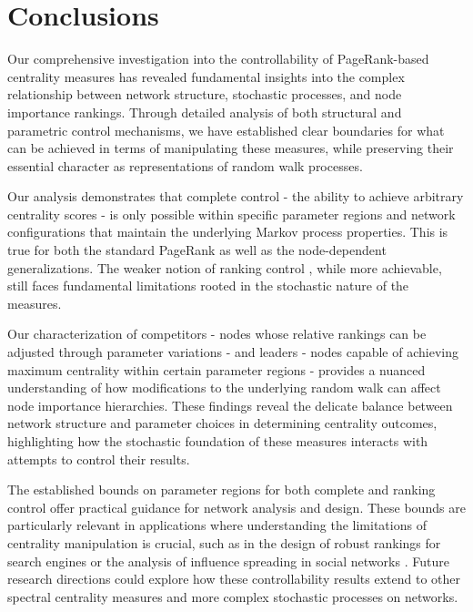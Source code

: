 \documentclass[sn-mathphys-ay]{sn-jnl}%
\theoremstyle{thmstyleone}%
\theoremstyle{thmstyletwo}%
\theoremstyle{thmstylethree}%
\begin{document}
\section{Conclusions}\label{sec:conclusions}


Our comprehensive investigation into the controllability of PageRank-based centrality measures has revealed fundamental insights into the complex relationship between network structure, stochastic processes, and node importance rankings. Through detailed analysis of both structural and parametric control mechanisms, we have established clear boundaries for what can be achieved in terms of manipulating these measures, while preserving their essential character as representations of random walk processes.


Our analysis demonstrates that complete control - the ability to achieve arbitrary centrality scores - is only possible within specific parameter regions and network configurations that maintain the underlying Markov process properties. This is true for both the standard PageRank as well as the node-dependent generalizations. The weaker notion of ranking control \cite{arrigo2020beyond, contrerasaso2023pagerank}, while more achievable, still faces fundamental limitations rooted in the stochastic nature of the measures.

Our characterization of competitors - nodes whose relative rankings can be adjusted through parameter variations - and leaders - nodes capable of achieving maximum centrality within certain parameter regions - provides a nuanced understanding of how modifications to the underlying random walk can affect node importance hierarchies. These findings reveal the delicate balance between network structure and parameter choices in determining centrality outcomes, highlighting how the stochastic foundation of these measures interacts with attempts to control their results.

The established bounds on parameter regions for both complete and ranking control offer practical guidance for network analysis and design. These bounds are particularly relevant in applications where understanding the limitations of centrality manipulation is crucial, such as in the design of robust rankings for search engines or the analysis of influence spreading in social networks \cite{gleich2015pagerank}. Future research directions could explore how these controllability results extend to other spectral centrality measures and more complex stochastic processes on networks.
\end{document}
